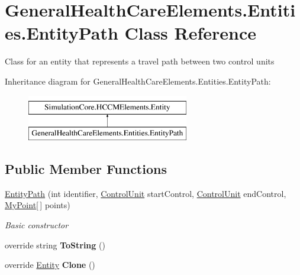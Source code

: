 \hypertarget{class_general_health_care_elements_1_1_entities_1_1_entity_path}{}\section{General\+Health\+Care\+Elements.\+Entities.\+Entity\+Path Class Reference}
\label{class_general_health_care_elements_1_1_entities_1_1_entity_path}


Class for an entity that represents a travel path between two control units  


Inheritance diagram for General\+Health\+Care\+Elements.\+Entities.\+Entity\+Path\+:\begin{figure}[H]
\begin{center}
\leavevmode
\includegraphics[height=2.000000cm]{class_general_health_care_elements_1_1_entities_1_1_entity_path}
\end{center}
\end{figure}
\subsection*{Public Member Functions}
\begin{DoxyCompactItemize}
\item 
\hyperlink{class_general_health_care_elements_1_1_entities_1_1_entity_path_a7c6cb62f4e94fc720969c80d25372d38}{Entity\+Path} (int identifier, \hyperlink{class_simulation_core_1_1_h_c_c_m_elements_1_1_control_unit}{Control\+Unit} start\+Control, \hyperlink{class_simulation_core_1_1_h_c_c_m_elements_1_1_control_unit}{Control\+Unit} end\+Control, \hyperlink{class_simulation_core_1_1_math_tool_1_1_geometric_classes_1_1_my_point}{My\+Point}\mbox{[}$\,$\mbox{]} points)
\begin{DoxyCompactList}\small\item\em Basic constructor \end{DoxyCompactList}\item 
override string {\bfseries To\+String} ()\hypertarget{class_general_health_care_elements_1_1_entities_1_1_entity_path_af7dc7d6018aba9fd850cd84944aeb787}{}\label{class_general_health_care_elements_1_1_entities_1_1_entity_path_af7dc7d6018aba9fd850cd84944aeb787}

\item 
override \hyperlink{class_simulation_core_1_1_h_c_c_m_elements_1_1_entity}{Entity} {\bfseries Clone} ()\hypertarget{class_general_health_care_elements_1_1_entities_1_1_entity_path_a76afe0ed1ad280cdf1602c8a718e4e7d}{}\label{class_general_health_care_elements_1_1_entities_1_1_entity_path_a76afe0ed1ad280cdf1602c8a718e4e7d}

\end{DoxyCompactItemize}
